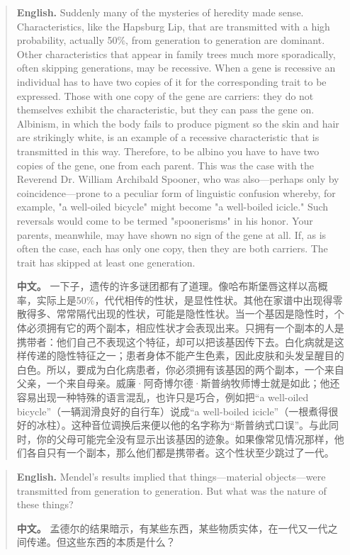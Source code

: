 \begin{quote}
\noindent\textbf{English.} Suddenly many of the mysteries of heredity made sense. Characteristics, like the Hapsburg Lip, that are transmitted with a high probability, actually 50\%, from generation to generation are dominant. Other characteristics that appear in family trees much more sporadically, often skipping generations, may be recessive. When a gene is recessive an individual has to have two copies of it for the corresponding trait to be expressed. Those with one copy of the gene are carriers: they do not themselves exhibit the characteristic, but they can pass the gene on. Albinism, in which the body fails to produce pigment so the skin and hair are strikingly white, is an example of a recessive characteristic that is transmitted in this way. Therefore, to be albino you have to have two copies of the gene, one from each parent. This was the case with the Reverend Dr. William Archibald Spooner, who was also---perhaps only by coincidence---prone to a peculiar form of linguistic confusion whereby, for example, "a well-oiled bicycle" might become "a well-boiled icicle." Such reversals would come to be termed "spoonerisms" in his honor. Your parents, meanwhile, may have shown no sign of the gene at all. If, as is often the case, each has only one copy, then they are both carriers. The trait has skipped at least one generation.

\smallskip
\noindent\textbf{中文。} 一下子，遗传的许多谜团都有了道理。像哈布斯堡唇这样以高概率，实际上是50\%，代代相传的性状，是显性性状。其他在家谱中出现得零散得多、常常隔代出现的性状，可能是隐性性状。当一个基因是隐性时，个体必须拥有它的两个副本，相应性状才会表现出来。只拥有一个副本的人是携带者：他们自己不表现这个特征，却可以把该基因传下去。白化病就是这样传递的隐性特征之一；患者身体不能产生色素，因此皮肤和头发呈醒目的白色。所以，要成为白化病患者，你必须拥有该基因的两个副本，一个来自父亲，一个来自母亲。威廉·阿奇博尔德·斯普纳牧师博士就是如此；他还容易出现一种特殊的语言混乱，也许只是巧合，例如把“a well-oiled bicycle”（一辆润滑良好的自行车）说成“a well-boiled icicle”（一根煮得很好的冰柱）。这种音位调换后来便以他的名字称为“斯普纳式口误”。与此同时，你的父母可能完全没有显示出该基因的迹象。如果像常见情况那样，他们各自只有一个副本，那么他们都是携带者。这个性状至少跳过了一代。
\end{quote}

\begin{quote}
\noindent\textbf{English.} Mendel's results implied that things---material objects---were transmitted from generation to generation. But what was the nature of these things?

\smallskip
\noindent\textbf{中文。} 孟德尔的结果暗示，有某些东西，某些物质实体，在一代又一代之间传递。但这些东西的本质是什么？
\end{quote}


